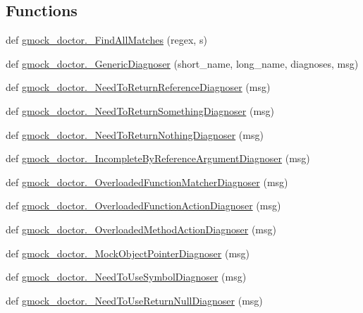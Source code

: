 \subsection*{Functions}
\begin{DoxyCompactItemize}
\item 
def \mbox{\hyperlink{namespacegmock__doctor_af9f6b7d876afcfe52864f2b928f5e6ab}{gmock\+\_\+doctor.\+\_\+\+Find\+All\+Matches}} (regex, s)
\item 
def \mbox{\hyperlink{namespacegmock__doctor_af5023d3e12d1f4a7171c6b035783de84}{gmock\+\_\+doctor.\+\_\+\+Generic\+Diagnoser}} (short\+\_\+name, long\+\_\+name, diagnoses, msg)
\item 
def \mbox{\hyperlink{namespacegmock__doctor_aa922367471c9e517f839f98e0e3b0a1c}{gmock\+\_\+doctor.\+\_\+\+Need\+To\+Return\+Reference\+Diagnoser}} (msg)
\item 
def \mbox{\hyperlink{namespacegmock__doctor_a1dc705b817ae15dbf51ebce10e47ed3f}{gmock\+\_\+doctor.\+\_\+\+Need\+To\+Return\+Something\+Diagnoser}} (msg)
\item 
def \mbox{\hyperlink{namespacegmock__doctor_a1d30848b5afc8437c05c03f9d4878a0d}{gmock\+\_\+doctor.\+\_\+\+Need\+To\+Return\+Nothing\+Diagnoser}} (msg)
\item 
def \mbox{\hyperlink{namespacegmock__doctor_a57b4c1486c344bd12e4138c588029c19}{gmock\+\_\+doctor.\+\_\+\+Incomplete\+By\+Reference\+Argument\+Diagnoser}} (msg)
\item 
def \mbox{\hyperlink{namespacegmock__doctor_a82934d9b43f75ab1112a9436c1a31068}{gmock\+\_\+doctor.\+\_\+\+Overloaded\+Function\+Matcher\+Diagnoser}} (msg)
\item 
def \mbox{\hyperlink{namespacegmock__doctor_a385cf8cf2ca6731bf66d721e2dbf89d1}{gmock\+\_\+doctor.\+\_\+\+Overloaded\+Function\+Action\+Diagnoser}} (msg)
\item 
def \mbox{\hyperlink{namespacegmock__doctor_a830bf3bac2d58666d82a75dfa0865c42}{gmock\+\_\+doctor.\+\_\+\+Overloaded\+Method\+Action\+Diagnoser}} (msg)
\item 
def \mbox{\hyperlink{namespacegmock__doctor_a91e21533e0bc183c40f5a9873158a94b}{gmock\+\_\+doctor.\+\_\+\+Mock\+Object\+Pointer\+Diagnoser}} (msg)
\item 
def \mbox{\hyperlink{namespacegmock__doctor_a9ee9925aa81453f121d44e0ad8f1bbaf}{gmock\+\_\+doctor.\+\_\+\+Need\+To\+Use\+Symbol\+Diagnoser}} (msg)
\item 
def \mbox{\hyperlink{namespacegmock__doctor_af4268f4fc3c0e612231b6a5d53e9e578}{gmock\+\_\+doctor.\+\_\+\+Need\+To\+Use\+Return\+Null\+Diagnoser}} (msg)

\end{DoxyCompactItemize}
